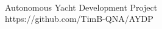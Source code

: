 \begin{titlepage}
\vspace*{7cm}
\begin{center}
{\Huge \userTitle } \\
\vspace*{2cm}
{\Large Autonomous Yacht Development Project} \\
{\small https://github.com/TimB-QNA/AYDP} \\
\vspace*{0.5cm}
{\small \userDate}\\
\end{center}
\end{titlepage}